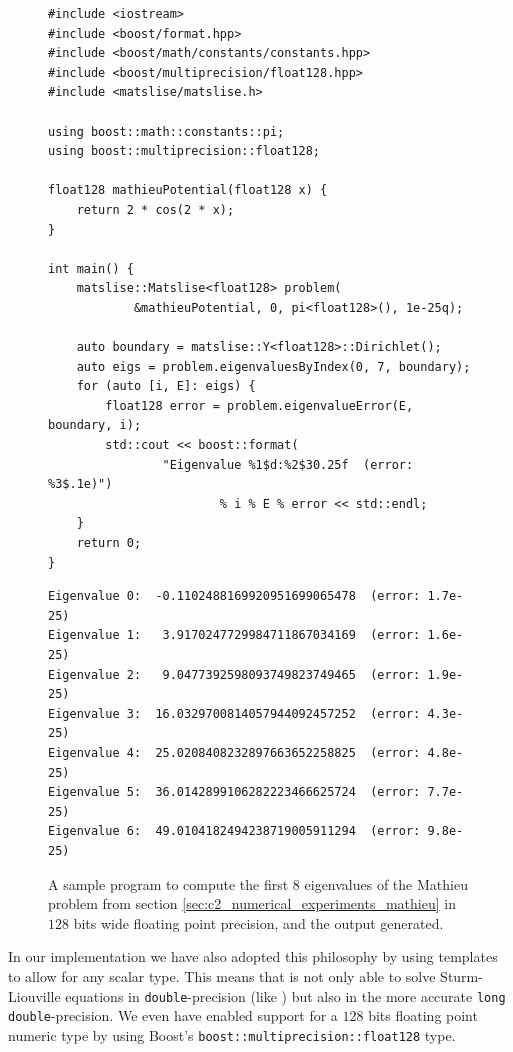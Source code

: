 \begin{figure}
\begin{verbatim}
#include <iostream>
#include <boost/format.hpp>
#include <boost/math/constants/constants.hpp>
#include <boost/multiprecision/float128.hpp>
#include <matslise/matslise.h>

using boost::math::constants::pi;
using boost::multiprecision::float128;

float128 mathieuPotential(float128 x) {
    return 2 * cos(2 * x);
}

int main() {
    matslise::Matslise<float128> problem(
            &mathieuPotential, 0, pi<float128>(), 1e-25q);

    auto boundary = matslise::Y<float128>::Dirichlet();
    auto eigs = problem.eigenvaluesByIndex(0, 7, boundary);
    for (auto [i, E]: eigs) {
        float128 error = problem.eigenvalueError(E, boundary, i);
        std::cout << boost::format(
                "Eigenvalue %1$d:%2$30.25f  (error: %3$.1e)")
                        % i % E % error << std::endl;
    }
    return 0;
}
\end{verbatim}
    \vspace{8mm}
\begin{verbatim}
Eigenvalue 0:  -0.1102488169920951699065478  (error: 1.7e-25)
Eigenvalue 1:   3.9170247729984711867034169  (error: 1.6e-25)
Eigenvalue 2:   9.0477392598093749823749465  (error: 1.9e-25)
Eigenvalue 3:  16.0329700814057944092457252  (error: 4.3e-25)
Eigenvalue 4:  25.0208408232897663652258825  (error: 4.8e-25)
Eigenvalue 5:  36.0142899106282223466625724  (error: 7.7e-25)
Eigenvalue 6:  49.0104182494238719005911294  (error: 9.8e-25)
\end{verbatim}
    \caption{A sample program to compute the first 8 eigenvalues of the Mathieu problem from section \ref{sec:c2_numerical_experiments_mathieu} in $128$ bits wide floating point precision, and the output generated.}
    \label{fig:c2_mathieu_quad_code}
\end{figure}

In our implementation we have also adopted this philosophy by using templates to allow for any scalar type. This means that  is not only able to solve Sturm-Liouville equations in \texttt{double}-precision (like ) but also in the more accurate \texttt{long double}-precision. We even have enabled support for a $128$ bits floating point  numeric type by using Boost's \cite{boost_float128_} \texttt{boost::multiprecision::float128} type.

